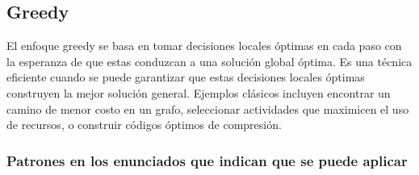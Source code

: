 \subsection{Greedy}
El enfoque greedy se basa en tomar decisiones locales óptimas en cada paso con la esperanza de que estas conduzcan a una solución global óptima. Es una técnica eficiente cuando se puede garantizar que estas decisiones locales óptimas construyen la mejor solución general. Ejemplos clásicos incluyen encontrar un camino de menor costo en un grafo, seleccionar actividades que maximicen el uso de recursos, o construir códigos óptimos de compresión.  

\subsubsection{Patrones en los enunciados que indican que se puede aplicar}  
